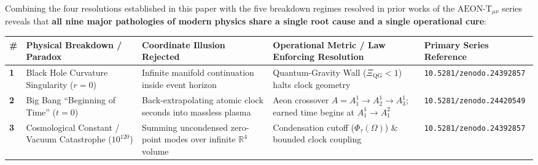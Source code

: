 \documentclass[
]{article}
\newcounter{none} %
\begin{document}
Combining the four resolutions established in this paper with the five
breakdown regimes resolved in prior works of the
\(\text{AEON-T}_{\mu\nu}\) series reveals that \textbf{all nine major
pathologies of modern physics share a single root cause and a single
operational cure}:

{\def\LTcaptype{none} %
\begin{longtable}[]{@{}
  >{\raggedright\arraybackslash}p{}
  >{\raggedright\arraybackslash}p{}
  >{\raggedright\arraybackslash}p{}
  >{\raggedright\arraybackslash}p{}
  >{\raggedright\arraybackslash}p{}@{}}
\toprule\noalign{}
\begin{minipage}[b]{\linewidth}\raggedright
\#
\end{minipage} & \begin{minipage}[b]{\linewidth}\raggedright
Physical Breakdown / Paradox
\end{minipage} & \begin{minipage}[b]{\linewidth}\raggedright
Coordinate Illusion Rejected
\end{minipage} & \begin{minipage}[b]{\linewidth}\raggedright
Operational Metric / Law Enforcing Resolution
\end{minipage} & \begin{minipage}[b]{\linewidth}\raggedright
Primary Series Reference
\end{minipage} \\
\midrule\noalign{}
\endhead
\bottomrule\noalign{}
\endlastfoot
\textbf{1} & Black Hole Curvature Singularity (\(r = 0\)) & Infinite
manifold continuation inside event horizon & Quantum-Gravity Wall
(\(\Xi_{\mathrm{QG}} < 1\)) halts clock geometry &
\texttt{10.5281/zenodo.24392857} \\
\textbf{2} & Big Bang ``Beginning of Time'' (\(t = 0\)) &
Back-extrapolating atomic clock seconds into massless plasma & Aeon
crossover \(A = A_1^1 \to A_2^1 \to A_3^1\); earned time begins at
\(A_1^1 \to A_1^2\) & \texttt{10.5281/zenodo.24420549} \\
\textbf{3} & Cosmological Constant / Vacuum Catastrophe (\(10^{120}\)) &
Summing uncondensed zero-point modes over infinite \(\mathbb{R}^4\)
volume & Condensation cutoff (\(\Phi_\tau(\Omega)\)) \& bounded clock
coupling & \texttt{10.5281/zenodo.24392857} \\

\end{longtable}}
\end{document}

